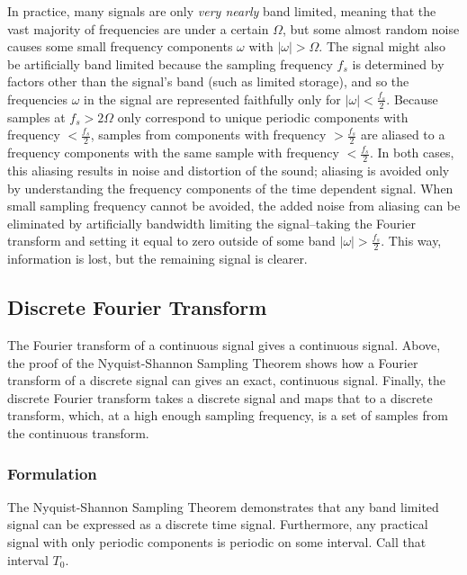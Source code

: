 \documentclass[12pt]{article}
\begin{document}
In practice, many signals are only \emph{very nearly} band limited, meaning
that the vast majority of frequencies are under a certain \( \Omega \), but
some almost random noise causes some small frequency components \( \omega \)
with \( |\omega| > \Omega \). The signal might also be artificially band
limited because the sampling frequency \( f_s\) is determined by factors other
than the signal's band (such as limited storage), and so the frequencies \(
\omega \) in the signal are represented faithfully only for \(|\omega| <
\frac{f_s}{2} \). Because samples at \( f_s > 2\Omega \) only correspond to
unique periodic components with frequency \( < \frac{f_s}{2} \), samples from
components with frequency \( > \frac{f_s}{2} \) are aliased to a frequency
components with the same sample with frequency \( < \frac{f_s}{2} \). In both
cases, this aliasing results in noise and distortion of the sound; aliasing is
avoided only by understanding the frequency components of the time dependent
signal. When small sampling frequency cannot be avoided, the added noise from
aliasing can be eliminated by artificially bandwidth limiting the
signal--taking the Fourier transform and setting it equal to zero outside of
some band \( |\omega| > \frac{f_s}{2}  \). This way, information is lost, but
the remaining signal is clearer. 


\subsection{Discrete Fourier Transform}

The Fourier transform of a continuous signal gives a continuous signal. Above,
the proof of the Nyquist-Shannon Sampling Theorem shows how a Fourier transform
of a discrete signal can gives an exact, continuous signal. Finally, the
discrete Fourier transform takes a discrete signal and maps that to a discrete
transform, which, at a high enough sampling frequency, is a set of samples from
the continuous transform.

\subsubsection{Formulation}

The Nyquist-Shannon Sampling Theorem demonstrates that any band limited signal
can be expressed as a discrete time signal. Furthermore, any practical signal
with only periodic components is periodic on some interval. Call that interval
\( T_0\). 
\end{document}
